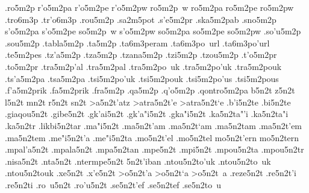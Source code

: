 {.ro5m2p      %
r'o5m2pa     %
r'o5m2pe
r'o5m2pw
ro5m2p~w
ro5m2pa
ro5m2pe
ro5m2pw
  .tro6m3p	 %
  .tr'o6m3p      %
.rou5m2p     %
.sa2m5pot    %
.s'e5m2pr    %
.ska5m2pab   %
.sno5m2p     %
s'o5m2pa     %
s'o5m2pe
so5m2p~w
s'o5m2pw
so5m2pa
so5m2pe
so5m2pw
.so'u5m2p    %
.sou5m2p
.tabla5m2p   %
.ta5m2p      %
  .ta6m3peram  %
  .ta6m3po~url %
  .ta6m3po'url
.te5m2pes    %
.tz'a5m2p    %
.tza5m2p
.tzana5m2p   %
.tzi5m2p     %
.tzou5m2p    %
.t'o5m2pr    %
.to5m2pr
.tra5m2p'al  %
.tra5m2pal
.tra5m2po~uk %
.tra5m2po'uk
.tra5m2pouk
.ts'a5m2pa   %
.tsa5m2pa
.tsi5m2po'uk %
.tsi5m2pouk
.tsi5m2po'us %
.tsi5m2pous
.f'a5m2prik  %
.fa5m2prik
.fra5m2p     %
.qa5m2p      %
.q'o5m2p     %
.qontro5m2pa %
b5n2t
z5n2t
l5n2t
mn2t
r5n2t
sn2t
>a5n2t'atz   %
>atra5n2t'e  %
>atra5n2t`e
.b'i5n2te    %
.bi5n2te
.giaqou5n2t  %
.gibe5n2t    %
.gk'ai5n2t   %
.gk'a"i5n2t
.gka"i5n2t
.ka5n2ta"'i  %
.ka5n2ta"i
.ka5n2tr     %
.likbi5n2tar %
.ma"i5n2t    %
.ma5n2t'am   %
.ma5n2t`am
.ma5n2tam
.ma5n2t'em   %
.ma5n2tem
.me"i5n2t'a  %
.me"i5n2ta
.mo5n2t'el   %
.mo5n2tel
mo5n2t'ern   %
mo5n2tern
.mpal'a5n2t  %
.mpala5n2t
.mpa5n2tan   %
.mpe5n2t     %
.mpi5n2t     %
.mpou5n2ta   %
.mpou5n2tr   %
.nisa5n2t    %
.nta5n2t     %
.ntermpe5n2t %
5n2t'iban    %
.ntou5n2to'uk %
.ntou5n2to~uk
.ntou5n2touk
.xe5n2t      %
.x'e5n2t
>o5n2t'a     %
>o5n2t`a
>o5n2t~a
.reze5n2t    %
.re5n2t'i    %
.re5n2ti 
.ro~u5n2t    %
.ro'u5n2t
.se5n2t'ef   %
.se5n2tef
.se5n2to~u   %
}
